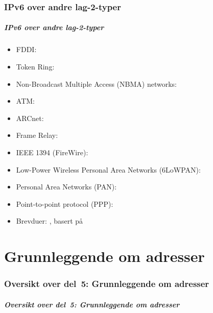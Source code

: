 \section{IPv6 over andre lag-2-typer}
\begin{frame}%
  \frametitle{IPv6 over andre lag-2-typer}
  \begin{itemize}%
  \item FDDI: 
  \item Token Ring: 
  \item Non-Broadcast Multiple Access (NBMA) networks: 
  \item ATM: 
  \item ARCnet: 
  \item Frame Relay: 
  \item IEEE 1394 (FireWire): 
  \item Low-Power Wireless Personal Area Networks (6LoWPAN): 
  \item Personal Area Networks (PAN): 
  \item Point-to-point protocol (PPP): 
  \item Brevduer: , basert på 
  \end{itemize}
\end{frame}

\part{Grunnleggende om adresser}

\begin{frame}
  \partpage
\end{frame}

\section*{Oversikt over del~5: Grunnleggende om adresser}
\begin{frame}[allowframebreaks]
  \frametitle{Oversikt over del~5: Grunnleggende om adresser}
    \tableofcontents%
\end{frame}

